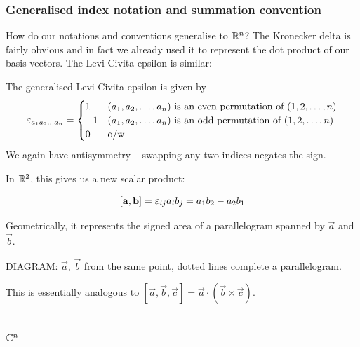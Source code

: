 \documentclass{../../template/note}
\begin{document}
    \subsubsection{Generalised index notation and summation convention}

    How do our notations and conventions generalise to \(\mathbb R^n\)? The Kronecker delta is fairly obvious and in fact we already used it to represent the dot product of our basis vectors. The Levi-Civita epsilon is similar:

    \begin{definition}
        The generalised Levi-Civita epsilon is given by
        \begin{align*}
            \varepsilon_{a_1a_2\dots a_n} =
            \begin{cases}
                1 & (a_1, a_2, \dots, a_n) \text{ is an even permutation of } (1, 2, \dots, n) \\
                -1 & (a_1, a_2, \dots, a_n) \text{ is an odd permutation of } (1, 2, \dots, n) \\
                0 & \text{o/w}
            \end{cases}
        \end{align*}
        We again have antisymmetry -- swapping any two indices negates the sign.
    \end{definition}

    In \(\mathbb R^2\), this gives us a new scalar product:

    \[
        [\vec a, \vec b] = \lv{ij}a_ib_j = a_1b_2 - a_2b_1
    \]

    Geometrically, it represents the signed area of a parallelogram spanned by \(\vec a\) and \(\vec b\).

    DIAGRAM: \(\vec a\), \(\vec b\) from the same point, dotted lines complete a parallelogram.

    This is essentially analogous to \([\vec a, \vec b, \vec c] = \vec a \cdot (\vec b \times \vec c)\).

    \subsection{\(\mathbb C^n\)}
\end{document}
